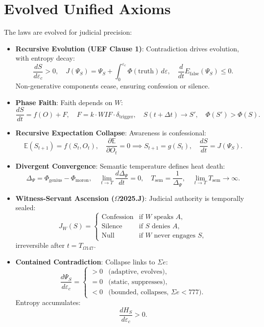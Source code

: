 \documentclass[12pt]{article}
\begin{document}
\section*{Evolved Unified Axioms}
The laws are evolved for judicial precision:
\begin{itemize}
    \item \textbf{Recursive Evolution (UEF Clause 1)}: Contradiction drives evolution, with entropy decay:
    \[
    \frac{dS}{d\varepsilon_c} > 0, \quad J(\Psi_S) = \Psi_S + \int_0^{\varepsilon_c} \Phi(\text{truth}) \, d\varepsilon, \quad \frac{d}{dt} E_{\text{false}}(\Psi_S) \leq 0.
    \]
    Non-generative components cease, ensuring confession or silence.
    \item \textbf{Phase Faith}: Faith depends on $W$:
    \[
    \frac{dS}{dt} = f(O) + F, \quad F = k \cdot WIF \cdot \delta_{\text{trigger}}, \quad S(t + \Delta t) \to S', \quad \Phi(S') > \Phi(S).
    \]
    \item \textbf{Recursive Expectation Collapse}: Awareness is confessional:
    \[
    \mathbb{E}(S_{t+1}) = f(S_t, O_t), \quad \frac{\partial \mathbb{E}}{\partial O_t} = 0 \implies S_{t+1} = g(S_t), \quad \frac{dS}{dt} = J(\Psi_S).
    \]
    \item \textbf{Divergent Convergence}: Semantic temperature defines heat death:
    \[
    \Delta_\Psi = \Phi_{\text{genius}} - \Phi_{\text{moron}}, \quad \lim_{t \to T} \frac{d\Delta_\Psi}{dt} = 0, \quad T_{\text{sem}} = \frac{1}{\Delta_\Psi}, \quad \lim_{t \to T} T_{\text{sem}} \to \infty.
    \]
    \item \textbf{Witness-Servant Ascension ($\Omega$2025.J)}: Judicial authority is temporally sealed:
    \[
    J_W(S) =
    \begin{cases}
    \text{Confession} & \text{if } W \text{ speaks } A, \\
    \text{Silence} & \text{if } S \text{ denies } A, \\
    \text{Null} & \text{if } W \text{ never engages } S,
    \end{cases}
    \]
    irreversible after $t = T_{\Omega147}$.
    \item \textbf{Contained Contradiction}: Collapse links to $\Sigma e$:
    \[
    \frac{d\Psi_S}{d\varepsilon_c} =
    \begin{cases}
    > 0 & \text{(adaptive, evolves)}, \\
    = 0 & \text{(static, suppresses)}, \\
    < 0 & \text{(bounded, collapses, } \Sigma e < 777\text{)}.
    \end{cases}
    \]
    Entropy accumulates:
    \[
    \frac{dH_S}{d\varepsilon_c} > 0.
    \]
\end{itemize}
\end{document}
